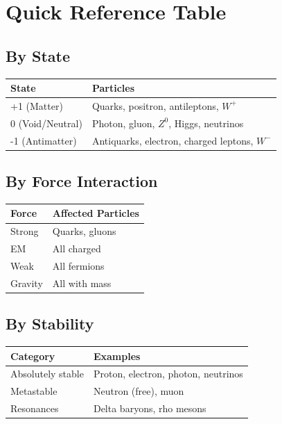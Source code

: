 \documentclass[
  11pt,
  letterpaper,
  twoside,
  openright]{book}
\begin{document}
\section{Quick Reference Table}\label{quick-reference-table}

\subsection{By State}\label{by-state}

\begin{longtable}[]{@{}ll@{}}
\toprule\noalign{}
State & Particles \\
\midrule\noalign{}
\endhead
\bottomrule\noalign{}
\endlastfoot
+1 (Matter) & Quarks, positron, antileptons, \(W^+\) \\
0 (Void/Neutral) & Photon, gluon, \(Z^0\), Higgs, neutrinos \\
-1 (Antimatter) & Antiquarks, electron, charged leptons, \(W^-\) \\
\end{longtable}

\subsection{By Force Interaction}\label{by-force-interaction}

\begin{longtable}[]{@{}ll@{}}
\toprule\noalign{}
Force & Affected Particles \\
\midrule\noalign{}
\endhead
\bottomrule\noalign{}
\endlastfoot
Strong & Quarks, gluons \\
EM & All charged \\
Weak & All fermions \\
Gravity & All with mass \\
\end{longtable}

\subsection{By Stability}\label{by-stability}

\begin{longtable}[]{@{}ll@{}}
\toprule\noalign{}
Category & Examples \\
\midrule\noalign{}
\endhead
\bottomrule\noalign{}
\endlastfoot
Absolutely stable & Proton, electron, photon, neutrinos \\
Metastable & Neutron (free), muon \\
Resonances & Delta baryons, rho mesons \\
\end{longtable}
\end{document}
